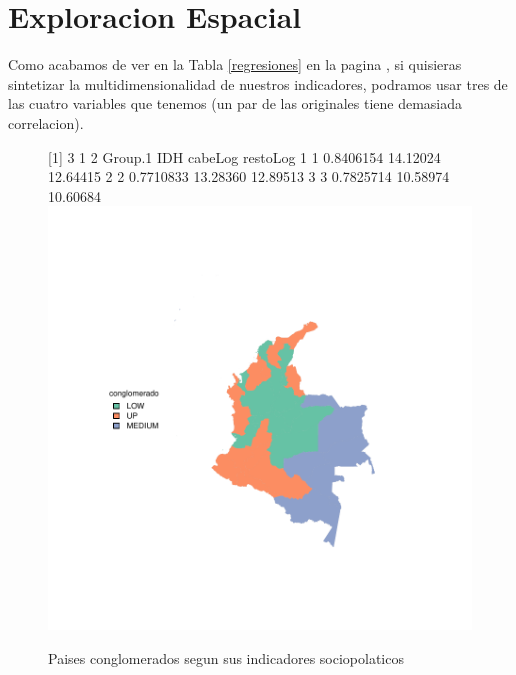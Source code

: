 \clearpage

\section{Exploracion Espacial}

Como acabamos de ver en la Tabla \ref{regresiones} en la pagina \pageref{regresiones}, si quisieras sintetizar la multidimensionalidad de nuestros indicadores, podramos usar tres de las cuatro variables que tenemos (un par de las originales tiene demasiada correlacion). 







\begin{figure}[h]
\centering
\begin{adjustbox}{width=20cm,height=15cm,clip,trim=22cm 0cm 0cm 0cm}
[1] 3 1 2  Group.1       IDH  cabeLog restoLog
1       1 0.8406154 14.12024 12.64415
2       2 0.7710833 13.28360 12.89513
3       3 0.7825714 10.58974 10.60684\includegraphics{Proyecto_Final_regresion-plotMapf}
\end{adjustbox}
\caption{Paises conglomerados segun sus indicadores sociopolaticos}\label{clustmap}
\end{figure}



\endinput

